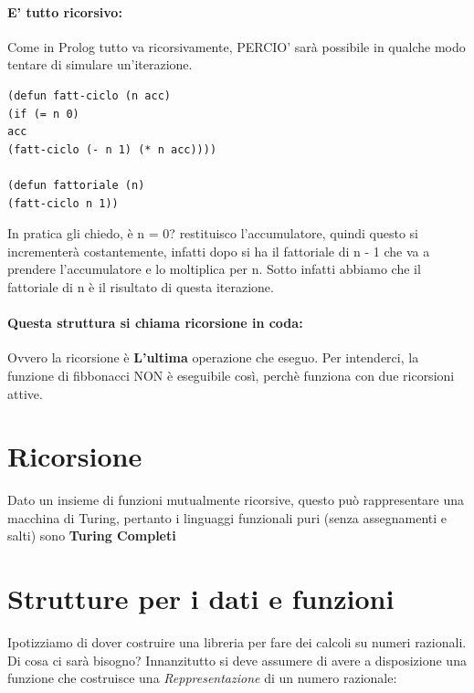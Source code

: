 \documentclass[12pt, a4paper, openany, oneside]{book}
\begin{document}
\paragraph{E' tutto ricorsivo: }Come in Prolog tutto va ricorsivamente, PERCIO' 
sarà possibile in qualche modo tentare di simulare un'iterazione.
\begin{lstlisting}[language = LISP]
(defun fatt-ciclo (n acc) 
(if (= n 0)
acc
(fatt-ciclo (- n 1) (* n acc))))

(defun fattoriale (n) 
(fatt-ciclo n 1))
\end{lstlisting}
In pratica gli chiedo, è n = 0? restituisco l'accumulatore, quindi questo si 
incrementerà costantemente, infatti dopo si ha il fattoriale di n - 1 che 
va a prendere l'accumulatore e lo moltiplica per n.
Sotto infatti abbiamo che il fattoriale di n è il risultato di questa iterazione.
\paragraph{Questa struttura si chiama ricorsione in coda: }Ovvero la ricorsione 
è \textbf{L'ultima} operazione che eseguo. Per intenderci, la funzione di fibbonacci
NON è eseguibile così, perchè funziona con due ricorsioni attive. 
\section*{Ricorsione}
Dato un insieme di funzioni mutualmente ricorsive, questo può rappresentare una 
macchina di Turing, pertanto i linguaggi funzionali puri (senza assegnamenti e
salti) sono \textbf{Turing Completi}
\section{Strutture per i dati e funzioni}
Ipotizziamo di dover costruire una libreria per fare dei calcoli su numeri 
razionali. Di cosa ci sarà bisogno? Innanzitutto si deve assumere di avere a 
disposizione una funzione che costruisce una \textit{Reppresentazione} di un 
numero razionale:
\end{document}
